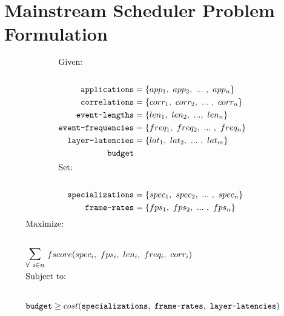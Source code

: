 \documentclass{article}
\newcommand{\var}{\texttt}
\begin{document}
\section*{Mainstream Scheduler Problem Formulation}

\begin{align*} 
\intertext{Given:} \\
\var{applications} &= \{app_1,~app_2,~...~,~app_n\} \\
\var{correlations} &= \{corr_1,~corr_2,~...~,~corr_n\} \\
\var{event-lengths} &= \{len_1,~len_2,~... ,~len_n\} \\
\var{event-frequencies} &= \{freq_1,~freq_2,~...~,~freq_n\} \\
\var{layer-latencies} &= \{lat_1,~lat_2,~...~,~lat_m\} \\
\var{budget} \\
\intertext{Set:} \\
\var{specializations} &= \{spec_1,~spec_2,~...~,~spec_n\} \\
\var{frame-rates} &= \{fps_1,~fps_2,~...~,~fps_n\} \\
\end{align*}
\vspace{-16pt}
\begin{align*}
\intertext{Maximize:} \\
&\mathlarger{\mathlarger{\sum}}_{\forall~i \in n }~fscore(spec_i,~fps_i,~len_i,~freq_i,~corr_i) \\
\intertext{Subject to:} \\
&\var{budget} \geq cost(\var{specializations},~\var{frame-rates},~\var{layer-latencies}) \\
\end{align*}
\end{document}
